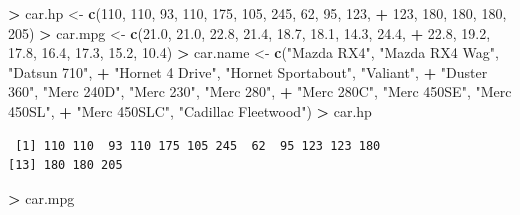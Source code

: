 \documentclass[
]{krantz}
\makeatletter
\newenvironment{Shaded}{\begin{snugshade}}{\end{snugshade}}
\newcommand{\DecValTok}[1]{\textcolor[rgb]{0.06,0.06,0.06}{#1}}
\newcommand{\FloatTok}[1]{\textcolor[rgb]{0.06,0.06,0.06}{#1}}
\newcommand{\KeywordTok}[1]{\textcolor[rgb]{0.27,0.27,0.27}{\textbf{#1}}}
\newcommand{\NormalTok}[1]{#1}
\newcommand{\OperatorTok}[1]{\textcolor[rgb]{0.43,0.43,0.43}{\textbf{#1}}}
\newcommand{\StringTok}[1]{\textcolor[rgb]{0.5,0.5,0.5}{#1}}
\newenvironment{kframe}{%
\medskip{}
\setlength{\fboxsep}{.8em}
 \def\at@end@of@kframe{}%
 \ifinner\ifhmode%
  \def\at@end@of@kframe{\end{minipage}}%
  \begin{minipage}{\columnwidth}%
 \fi\fi%
 \def\FrameCommand##1{\hskip\@totalleftmargin \hskip-\fboxsep
 \colorbox{shadecolor}{##1}\hskip-\fboxsep
     \hskip-\linewidth \hskip-\@totalleftmargin \hskip\columnwidth}%
 \MakeFramed {\advance\hsize-\width
   \@totalleftmargin\z@ \linewidth\hsize
   \@setminipage}}%
 {\par\unskip\endMakeFramed%
 \at@end@of@kframe}
\renewenvironment{Shaded}{\begin{kframe}}{\end{kframe}}
\makeatother
\begin{document}
\begin{Shaded}
\begin{Highlighting}[]
\OperatorTok{\textgreater{}}\StringTok{ }\NormalTok{car.hp \textless{}{-}}\StringTok{ }\KeywordTok{c}\NormalTok{(}\DecValTok{110}\NormalTok{, }\DecValTok{110}\NormalTok{, }\DecValTok{93}\NormalTok{, }\DecValTok{110}\NormalTok{, }\DecValTok{175}\NormalTok{, }\DecValTok{105}\NormalTok{, }\DecValTok{245}\NormalTok{, }\DecValTok{62}\NormalTok{, }\DecValTok{95}\NormalTok{, }\DecValTok{123}\NormalTok{, }
\OperatorTok{+}\StringTok{ }\DecValTok{123}\NormalTok{, }\DecValTok{180}\NormalTok{, }\DecValTok{180}\NormalTok{, }\DecValTok{180}\NormalTok{, }\DecValTok{205}\NormalTok{)}
\OperatorTok{\textgreater{}}\StringTok{ }\NormalTok{car.mpg \textless{}{-}}\StringTok{ }\KeywordTok{c}\NormalTok{(}\FloatTok{21.0}\NormalTok{, }\FloatTok{21.0}\NormalTok{, }\FloatTok{22.8}\NormalTok{, }\FloatTok{21.4}\NormalTok{, }\FloatTok{18.7}\NormalTok{, }\FloatTok{18.1}\NormalTok{, }\FloatTok{14.3}\NormalTok{, }\FloatTok{24.4}\NormalTok{, }
\OperatorTok{+}\StringTok{        }\FloatTok{22.8}\NormalTok{, }\FloatTok{19.2}\NormalTok{, }\FloatTok{17.8}\NormalTok{, }\FloatTok{16.4}\NormalTok{, }\FloatTok{17.3}\NormalTok{, }\FloatTok{15.2}\NormalTok{, }\FloatTok{10.4}\NormalTok{)}
\OperatorTok{\textgreater{}}\StringTok{ }\NormalTok{car.name \textless{}{-}}\StringTok{ }\KeywordTok{c}\NormalTok{(}\StringTok{"Mazda RX4"}\NormalTok{, }\StringTok{"Mazda RX4 Wag"}\NormalTok{, }\StringTok{"Datsun 710"}\NormalTok{, }
\OperatorTok{+}\StringTok{               "Hornet 4 Drive"}\NormalTok{, }\StringTok{"Hornet Sportabout"}\NormalTok{, }\StringTok{"Valiant"}\NormalTok{, }
\OperatorTok{+}\StringTok{               "Duster 360"}\NormalTok{, }\StringTok{"Merc 240D"}\NormalTok{, }\StringTok{"Merc 230"}\NormalTok{, }\StringTok{"Merc 280"}\NormalTok{, }
\OperatorTok{+}\StringTok{               "Merc 280C"}\NormalTok{, }\StringTok{"Merc 450SE"}\NormalTok{, }\StringTok{"Merc 450SL"}\NormalTok{, }
\OperatorTok{+}\StringTok{               "Merc 450SLC"}\NormalTok{, }\StringTok{"Cadillac Fleetwood"}\NormalTok{)}
\OperatorTok{\textgreater{}}\StringTok{ }\NormalTok{car.hp}
\end{Highlighting}
\end{Shaded}

\begin{verbatim}
 [1] 110 110  93 110 175 105 245  62  95 123 123 180
[13] 180 180 205
\end{verbatim}

\begin{Shaded}
\begin{Highlighting}[]
\OperatorTok{\textgreater{}}\StringTok{ }\NormalTok{car.mpg}
\end{Highlighting}
\end{Shaded}
\end{document}
